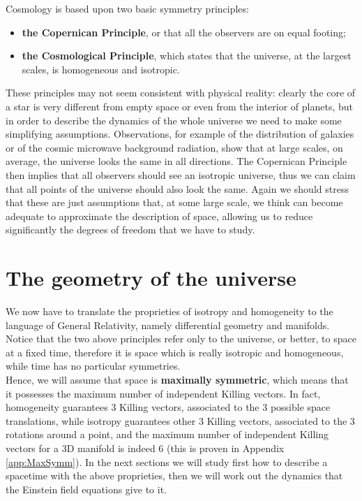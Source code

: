 Cosmology is based upon two basic symmetry principles:
\begin{itemize}
    \item \textbf{the Copernican Principle}, or that all the observers are on equal footing;
    \item \textbf{the Cosmological Principle}, which states that the universe, at the largest scales, is homogeneous and isotropic.
\end{itemize}
These principles may not seem consistent with physical reality: clearly the core of a star is very different from empty space or even from the interior of planets, but in order to describe the dynamics of the whole universe we need to make some simplifying assumptions. Observations, for example of the distribution of galaxies or of the cosmic microwave background radiation, show that at large scales, on average, the universe looks the same in all directions. The Copernican Principle then implies that all observers should see an isotropic universe, thus we can claim that all points of the universe should also look the same. Again we should stress that these are just assumptions that, at some large scale, we think can become adequate to approximate the description of space, allowing us to reduce significantly the degrees of freedom that we have to study.
\section{The geometry of the universe}
We now have to translate the proprieties of isotropy and homogeneity to the language of General Relativity, namely differential geometry and manifolds.\\ Notice that the two above principles refer only to the universe, or better, to space at a fixed time, therefore it is space which is really isotropic and homogeneous, while time has no particular symmetries.\\
Hence, we will assume that space is \textbf{maximally symmetric}, which means that it possesses the maximum number of independent Killing vectors. In fact, homogeneity guarantees 3 Killing vectors, associated to the 3 possible space translations, while isotropy guarantees other 3 Killing vectors, associated to the 3 rotations around a point, and the maximum number of independent Killing vectors for a 3D manifold is indeed 6 (this is proven in Appendix \ref{app:MaxSymm}).
In the next sections we will study first how to describe a spacetime with the above proprieties, then we will work out the dynamics that the Einstein field equations give to it.
